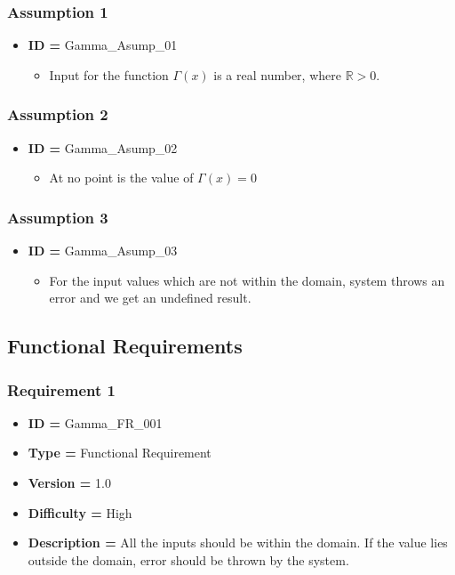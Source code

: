 \documentclass[12pt]{report}
\begin{document}
\subsubsection{Assumption 1}
\begin{itemize}
    \item \textbf{ID = }Gamma\_Asump\_01
    \begin{itemize}
        \item Input for the function $\Gamma(x)$ is a real number, where $\mathbb{R}>0.$
    \end{itemize}
\end{itemize}

\subsubsection{Assumption 2}
\begin{itemize}
    \item \textbf{ID = }Gamma\_Asump\_02
    \begin{itemize}
        \item At no point is the value of $\Gamma(x) = 0$
    \end{itemize}
\end{itemize}

\subsubsection{Assumption 3}
\begin{itemize}
    \item \textbf{ID = }Gamma\_Asump\_03
    \begin{itemize}
        \item For the input values which are not within the domain, system throws an error and we get an undefined result.
    \end{itemize}
\end{itemize}

\subsection{Functional Requirements}
\subsubsection{Requirement 1}
\begin{itemize}
    \item \textbf{ID = }Gamma\_FR\_001
    \item \textbf{Type = }Functional Requirement
    \item \textbf{Version = } 1.0
    \item \textbf{Difficulty = }High
    \item \textbf{Description = } All the inputs should be within the domain. If the value lies outside the domain, error should be thrown by the system.
\end{itemize}
\end{document}

